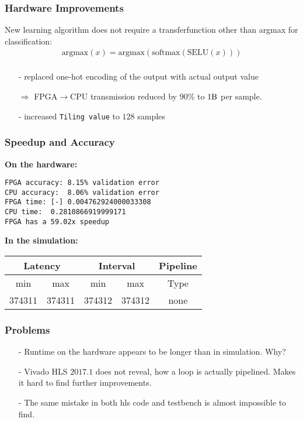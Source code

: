 \documentclass{beamer}
\begin{document}
\begin{frame}
\frametitle{Hardware Improvements}
New learning algorithm does not require a transferfunction other than argmax for classification:
\begin{align*}
		\text{argmax}(x) = \text{argmax}(\text{softmax}(\text{SELU}(x))) \\
\end{align*}
	\begin{itemize}
		\item[-] replaced one-hot encoding of the output with actual output value
		\item[$\Rightarrow$] FPGA$\rightarrow$CPU transmission reduced by $90\si{\percent}$ to $1\si{\byte}$ per sample. 
		\item[-] increased \texttt{Tiling value} to $128$ samples
	\end{itemize}
\end{frame}

\begin{frame}[fragile]
	\frametitle{Speedup and Accuracy}
	\textbf{On the hardware:}
\begin{lstlisting}
FPGA accuracy: 8.15% validation error
CPU accuracy:  8.06% validation error
FPGA time: [-] 0.004762924000033308
CPU time:  0.2810866919999171
FPGA has a 59.02x speedup 
\end{lstlisting}
\textbf{In the simulation:}\\
\vspace{0.5cm}
    \begin{tabular}{ccccc}
        \multicolumn{2}{c}{Latency} & \multicolumn{2}{c}{Interval} & Pipeline\\
        \hline
        min  &   max  &   min  &   max  &   Type  \\
	    374311&  374311&  374312&  374312&   none  
    \end{tabular}


\end{frame}

\begin{frame}
\frametitle{Problems}
\begin{itemize}
	\item[-] Runtime on the hardware appears to be longer than in simulation. Why?
	\item[-] Vivado HLS $2017.1$ does not reveal, how a loop is actually pipelined. Makes it hard to find further improvements.
	\item[-] The same mistake in both hls code and testbench is almost impossible to find.
\end{itemize}

\end{frame}
\end{document}
